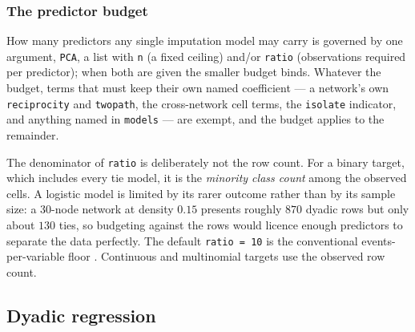 \documentclass[11pt,a4paper]{article}
\newcommand{\code}[1]{\texttt{#1}}
\begin{document}
\subsubsection{The predictor budget}
\label{sec:pca}

How many predictors any single imputation model may carry is governed by one
argument, \code{PCA}, a list with \code{n} (a fixed ceiling) and/or
\code{ratio} (observations required per predictor); when both are given the
smaller budget binds. Whatever the budget, terms that must keep their own
named coefficient --- a network's own \code{reciprocity} and \code{twopath},
the cross-network cell terms, the \code{isolate} indicator, and anything named
in \code{models} --- are exempt, and the budget applies to the remainder.

The denominator of \code{ratio} is deliberately not the row count. For a
binary target, which includes every tie model, it is the \emph{minority class
count} among the observed cells. A logistic model is limited by its rarer
outcome rather than by its sample size: a 30-node network at density $0.15$
presents roughly $870$ dyadic rows but only about $130$ ties, so budgeting
against the rows would licence enough predictors to separate the data
perfectly. The default \code{ratio = 10} is the conventional
events-per-variable floor \citep{Peduzzi1996,Harrell2015}. Continuous and
multinomial targets use the observed row count.

\subsection{Dyadic regression}
\label{sec:dyad}
\end{document}

